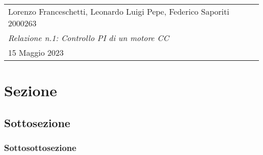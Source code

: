 \documentclass[a4paper,11pt, Arial]{article}
\newcommand{\class}{Laboratorio di Automatica}
\newcommand{\expT}{Controllo PI di un motore CC}
\newcommand{\repN}{1}
\newcommand{\stud}{Lorenzo Franceschetti, Leonardo Luigi Pepe, Federico Saporiti}
\newcommand{\studN}{2000263}
\newcommand{\dateD}{15 Maggio 2023}
\begin{document}

\begin{center}
\begin{tabular}{| p{\textwidth} |}
    \hline
    \large
    \vspace{-2pt}
    {\stud} \hfill {\studN}
    \Large
    \begin{center}
    {\color{BrickRed}
        \textsl{\class}\\
        \textsl{Relazione n.\repN: \expT}\\
        \large
        \dateD}
    \vspace{-4mm}
    \end{center}\\
    \hline
\end{tabular}
\end{center}

\section{Sezione}

\subsection{Sottosezione}

\subsubsection{Sottosottosezione}
\end{document}
